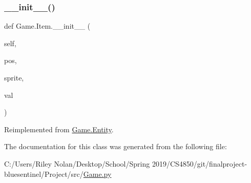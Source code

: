 \subsubsection{\texorpdfstring{\_\_init\_\_()}{\_\_init\_\_()}}
{\footnotesize\ttfamily def Game.\+Item.\+\_\+\+\_\+init\+\_\+\+\_\+ (\begin{DoxyParamCaption}\item[{}]{self,  }\item[{}]{pos,  }\item[{}]{sprite,  }\item[{}]{val }\end{DoxyParamCaption})}



Reimplemented from \mbox{\hyperlink{class_game_1_1_entity_a1cbc73a05ee02271fa7dca66f3a83ecf}{Game.\+Entity}}.



The documentation for this class was generated from the following file\+:\begin{DoxyCompactItemize}
\item 
C\+:/\+Users/\+Riley Nolan/\+Desktop/\+School/\+Spring 2019/\+C\+S4850/git/finalproject-\/bluesentinel/\+Project/src/\mbox{\hyperlink{_game_8py}{Game.\+py}}\end{DoxyCompactItemize}
